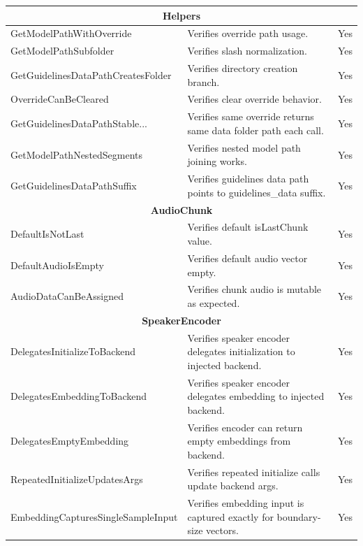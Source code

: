\begin{longtable}{|p{}|p{}|c|}
\hline
\multicolumn{3}{|c|}{\textbf{Helpers}} \\
\hline
GetModelPathWithOverride & Verifies override path usage. & Yes \\ \hline
GetModelPathSubfolder & Verifies slash normalization. & Yes \\ \hline
GetGuidelinesDataPathCreatesFolder & Verifies directory creation branch. & Yes \\ \hline
OverrideCanBeCleared & Verifies clear override behavior. & Yes \\ \hline
GetGuidelinesDataPathStable... & Verifies same override returns same data folder path each call. & Yes \\ \hline
GetModelPathNestedSegments & Verifies nested model path joining works. & Yes \\ \hline
GetGuidelinesDataPathSuffix & Verifies guidelines data path points to guidelines\_data suffix. & Yes \\ \hline

\hline
\multicolumn{3}{|c|}{\textbf{AudioChunk}} \\
\hline
DefaultIsNotLast & Verifies default isLastChunk value. & Yes \\ \hline
DefaultAudioIsEmpty & Verifies default audio vector empty. & Yes \\ \hline
AudioDataCanBeAssigned & Verifies chunk audio is mutable as expected. & Yes \\ \hline

\hline
\multicolumn{3}{|c|}{\textbf{SpeakerEncoder}} \\
\hline
DelegatesInitializeToBackend & Verifies speaker encoder delegates initialization to injected backend. & Yes \\ \hline
DelegatesEmbeddingToBackend & Verifies speaker encoder delegates embedding to injected backend. & Yes \\ \hline
DelegatesEmptyEmbedding & Verifies encoder can return empty embeddings from backend. & Yes \\ \hline
RepeatedInitializeUpdatesArgs & Verifies repeated initialize calls update backend args. & Yes \\ \hline
EmbeddingCapturesSingleSampleInput & Verifies embedding input is captured exactly for boundary-size vectors. & Yes \\ \hline


\end{longtable}
